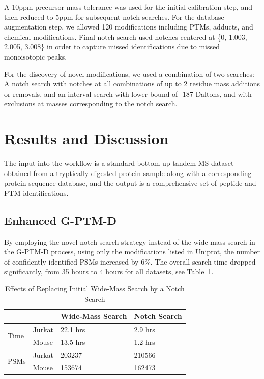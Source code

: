 \documentclass[journal=jprobs,manuscript=article]{achemso}
\begin{document}
A 10ppm precursor mass tolerance was used for the initial calibration step, and then reduced to 5ppm for subsequent notch searches.
For the database augmentation step, we allowed 120 modifications including PTMs, adducts, and chemical modifications.
Final notch search used notches centered at \{0, 1.003, 2.005, 3.008\} in order to capture missed identifications due to missed monoisotopic peaks.

For the discovery of novel modifications, we used a combination of two searches: A notch search with notches at all combinations of up to 2 residue mass additions or removals, and an interval search with lower bound of -187 Daltons, and with exclusions at masses corresponding to the notch search.

\section{Results and Discussion}

The input into the workflow is a standard bottom-up tandem-MS dataset obtained from a tryptically digested protein sample along with a corresponding protein sequence database, and the output is a comprehensive set of peptide and PTM identifications.
 
\subsection{Enhanced G-PTM-D}

By employing the novel notch search strategy instead of the wide-mass search in the G-PTM-D process, using only the modifications listed in Uniprot, the number of confidently identified PSMs increased by 6\%.
The overall search time dropped significantly, from 35 hours to 4 hours for all datasets, see Table~\ref{my-label}.

\begin{table}[]
\centering
\caption{Effects of Replacing Initial Wide-Mass Search by a Notch Search}
\label{my-label}
\begin{tabular}{ll|l|l}
                      &        & Wide-Mass Search & Notch Search\\
\hline
\multirow{2}{*}{Time} & Jurkat & 22.1 hrs         & 2.9 hrs    \\
                      & Mouse  & 13.5 hrs         & 1.2 hrs   \\
\hline
\multirow{2}{*}{PSMs} & Jurkat & 203237           & 210566    \\
                      & Mouse  & 153674           & 162473   
\end{tabular}
\end{table}
\end{document}

